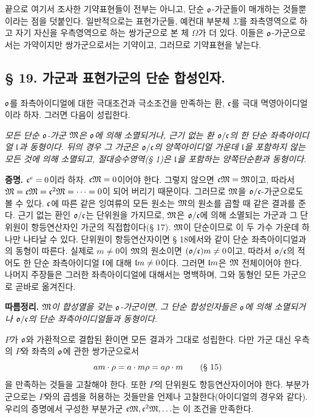 끝으로 여기서 조사한 기약표현들이 전부는 아니고, 단순 \(\mathfrak o\)-가군들이 매개하는 것들뿐이라는 점을 덧붙인다. 일반적으로는 표현가군들, 예컨대 부분체 \(\Sigma\)를 좌측영역으로 하고 자기 자신을 우측영역으로 하는 쌍가군으로 본 체 \(\Omega\)가 더 있다. 이들은 \(\mathfrak o\)-가군으로서는 가약이지만 쌍가군으로서는 기약이고, 그러므로 기약표현을 낳는다.

\subsection*{§ 19. 가군과 표현가군의 단순 합성인자.}

\(\mathfrak o\)를 좌측아이디얼에 대한 극대조건과 극소조건을 만족하는 환, \(\mathfrak c\)를 극대 멱영아이디얼이라 하자. 그러면 다음이 성립한다.

\emph{모든 단순 \(\mathfrak o\)-가군 \(\mathfrak M\)은 \(\mathfrak o\)에 의해 소멸되거나, 근기 없는 환 \(\mathfrak o/\mathfrak c\)의 한 단순 좌측아이디얼 \(\mathfrak l\)과 동형이다. 뒤의 경우 그 가군은 \(\mathfrak o/\mathfrak c\)의 양쪽아이디얼 가운데 \(\mathfrak l\)을 포함하지 않는 모든 것에 의해 소멸되고, 절대승수영역(§ 1)은 \(\mathfrak l\)을 포함하는 양쪽단순환과 동형이다.}

\textbf{증명.} \(\mathfrak c^e=0\)이라 하자. \(\mathfrak c\mathfrak M=0\)이어야 한다. 그렇지 않으면 \(\mathfrak c\mathfrak M=\mathfrak M\)이고, 따라서 \(\mathfrak M=\mathfrak c\mathfrak M=\mathfrak c^2\mathfrak M=\cdots=0\)이 되어 버리기 때문이다. 그러므로 \(\mathfrak M\)을 \(\mathfrak o/\mathfrak c\)-가군으로도 볼 수 있다. \(\mathfrak c\)에 따른 같은 잉여류의 모든 원소는 \(\mathfrak M\)의 원소를 곱할 때 같은 결과를 준다. 근기 없는 환인 \(\mathfrak o/\mathfrak c\)는 단위원을 가지므로, \(\mathfrak M\)은 \(\mathfrak o/\mathfrak c\)에 의해 소멸되는 가군과 그 단위원이 항등연산자인 가군의 직접합이다(§ 17). \(\mathfrak M\)이 단순이므로 이 두 가수 가운데 하나만 나타날 수 있다. 단위원이 항등연산자이면 § 18에서와 같이 단순 좌측아이디얼과의 동형이 따른다. 실제로 \(m\ne0\)이 \(\mathfrak M\)의 원소이면 \((\mathfrak o/\mathfrak c)m\ne0\)이고, 따라서 \(\mathfrak o/\mathfrak c\)의 적어도 한 단순 좌측아이디얼 \(\mathfrak l\)에 대해 \(\mathfrak l m\ne0\)이다. 그러면 \(\mathfrak l m\)은 \(\mathfrak M\) 전체이어야 한다. 나머지 주장들은 그러한 좌측아이디얼에 대해서는 명백하며, 그와 동형인 모든 가군으로 곧바로 옮겨진다.

\textbf{따름정리.} \emph{\(\mathfrak M\)이 합성열을 갖는 \(\mathfrak o\)-가군이면, 그 단순 합성인자들은 \(\mathfrak o\)에 의해 소멸되거나 \(\mathfrak o/\mathfrak c\)의 단순 좌측아이디얼들과 동형이다.}

\(P\)가 \(\mathfrak o\)와 가환적으로 결합된 환이면 모든 결과가 그대로 성립한다. 다만 가군 대신 우측의 \(P\)와 좌측의 \(\mathfrak o\)에 관한 쌍가군으로서
\[
        am\cdot\rho=a\cdot m\rho=a\rho\cdot m
        \qquad\hbox{(§ 15)}
\]
을 만족하는 것들을 고찰해야 한다. 또한 \(P\)의 단위원도 항등연산자이어야 한다. 부분가군으로는 \(P\)와의 곱셈을 허용하는 것들만을 언제나 고찰한다(아이디얼의 경우와 같다). 우리의 증명에서 구성한 부분가군 \(\mathfrak c\mathfrak M,\mathfrak c^2\mathfrak M,\ldots\)는 이 조건을 만족한다.

